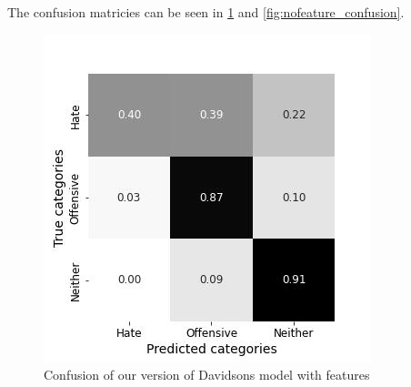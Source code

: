 \documentclass[11pt,a4paper]{article}
\begin{document}
\begin{table}
\caption{classification report for our reproduction of Davidson's model without features} 



\label{tab:davidson_nofeat}
\end{table}

The confusion matricies can be seen in \ref{fig:feature_confusion} and \ref{fig:nofeature_confusion}.

\begin{figure}[h]
  \includegraphics[width=\linewidth]{./tables-figures/feat_confusion.jpg}
  \caption{Confusion of our version of Davidsons model with features}
  \label{fig:feature_confusion}
\end{figure}
\end{document}
